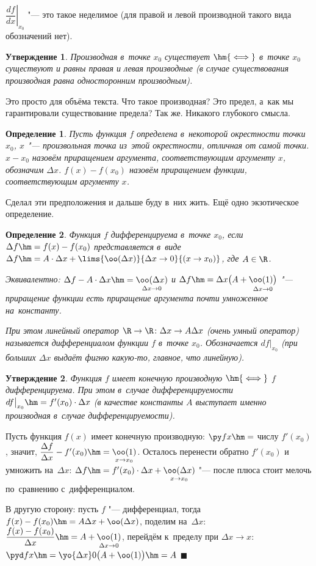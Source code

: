 \documentclass[a4paper,10pt,twoside]{article}
\newtheorem{Def}{Определение}[section]
\newtheorem{Ut}{Утверждение}[section]
\newenvironment{Proof}
       {\par\noindent{\textbf{Доказательство.}}}
       {\hfill$\scriptstyle\blacksquare$}
\begin{document}
$\left.\dfrac{df}{dx}\right|_{x_0}$ "--- это такое неделимое (для правой и левой производной такого вида обозначений нет).

\begin{Ut}
    Производная в~точке $x_0$ существует $\hm{\iff}$ в~точке $x_0$ существуют и равны правая и левая производные (в случае существования производная равна односторонним производным).
\end{Ut}

Это просто для объёма текста. Что такое производная? Это предел, а~как мы гарантировали существование предела? Так же. Никакого глубокого смысла.

\begin{Def}
    Пусть функция $f$ определена в~некоторой окрестности точки $x_0$, $x$ "--- произвольная точка из~этой окрестности, отличная от самой точки. $x-x_0$ назовём приращением аргумента, соответствующим аргументу $x$, обозначим $\Delta x$.
    $f(x)-f(x_0)$ назовём приращением функции, соответствующим аргументу $x$.
\end{Def}

Сделал эти предположения и дальше буду в~них жить. Ещё одно экзотическое определение.

\begin{Def}
    Функция $f$ дифференцируема в~точке $x_0$, если $\Delta f\hm=f(x)-f(x_0)$ представляется в~виде $\Delta f\hm=A\cdot\Delta x+\lims{\oo(\Delta x)}{\Delta x\to 0}{(x\to x_0)}$, где $A\in \R$.

    Эквивалентно: $\Delta f-A\cdot\Delta x\hm=\underset{\Delta x\to0}{\oo(\Delta x)}$ и $\Delta f\hm=\Delta x\big(A+\underset{\Delta x\to 0}{\oo(1)\big)}$ "--- приращение функции есть приращение аргумента почти умноженное на~константу.


При этом линейный оператор $\R\to\R\colon \Delta x\to A\Delta x$ (очень умный оператор) называется дифференциалом функции $f$ в~точке $x_0$.
Обозначается $df\big|_{x_0}$ (при больших $\Delta x$ выдаёт фигню какую-то, главное, что линейную).

 \end{Def}

 \begin{Ut}
Функция $f$ имеет конечную производную $\hm{\iff}$ $f$ дифференцируема. При этом в~случае дифференцируемости
$df\big|_{x_0}\hm=f'(x_0)\cdot\Delta x$ (в качестве константы $A$ выступает именно производная в~случае дифференцируемости).
 \end{Ut}

 \begin{Proof}
Пусть функция $f(x)$ имеет конечную производную: $\py fx\hm=$ числу $f'(x_0)$, значит, $\dfrac{\Delta f}{\Delta x}-f'(x_0)\hm=\underset{x\to x_0}{\oo(1)}$. Осталось перенести обратно $f'(x_0)$ и умножить на~$\Delta x$: $\Delta f\hm=f'(x_0)\cdot\Delta x+\underset{x\to x_0}{\oo(\Delta x)}$ "--- после плюса стоит мелочь по~сравнению с~дифференциалом.

В другую сторону: пусть $f$ "--- дифференциал, тогда $f(x)-f(x_0)\hm=A\Delta x+\oo(\Delta x)$, поделим на~$\Delta x$: $\dfrac{f(x)-f(x_0)}{\Delta x}\hm=A+\underset{\Delta x\to0}{\oo(1)}$, перейдём к~пределу при $\Delta x\to x$:
$\pyd fx\hm=\yo{\Delta x}0 \big(A+\oo(1)\big)\hm=A$
 \end{Proof}
\end{document}
